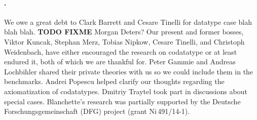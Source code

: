 \paragraph{\ackname.}
We owe a great debt to Clark Barrett and Cesare Tinelli for datatype case blah
blah blah. \textbf{TODO FIXME}
Morgan Deters?
%
Our present and former bosses, Viktor Kuncak, Stephan Merz, Tobias Nipkow,
Cesare Tinelli, and Christoph Weidenbach, have either encouraged the research on
codatatype or at least endured
it, both of which we are thankful for.
%
Peter Gammie and Andreas Lochbihler shared their private
theories with us so we could include them in the benchmarks.
Andrei Popescu helped clarify our thoughts regarding the axiomatization of
codatatypes. Dmitriy Traytel took part in discussions about special
cases.
%
Blanchette's research was partially supported by the Deutsche
Forschungs\-gemein\-schaft (DFG) project
 (grant Ni\,491\slash 14-1).


{}


